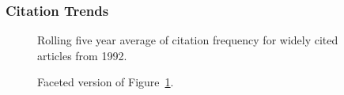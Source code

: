 \documentclass[
  10pt,
  letterpaper,
  DIV=11,
  numbers=noendperiod,
  twoside]{scrartcl}
\begin{document}
\subsubsection*{Citation Trends}\label{sec-trends-1992}

\begin{figure}


\caption{\label{fig-citation-spaghetti-1992}Rolling five year average of
citation frequency for widely cited articles from 1992.}

\end{figure}%

\begin{figure}


\caption{\label{fig-citation-facet-1992}Faceted version of
Figure~\ref{fig-citation-spaghetti-1992}.}

\end{figure}%
\end{document}
